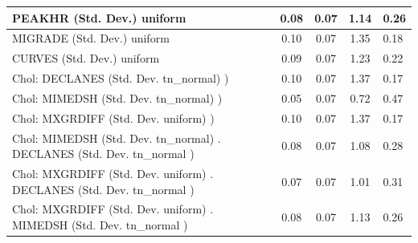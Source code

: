 \begin{table}
\begin{center}
\begin{tabular}{|l|l|c|c|c|l|}
			\hline
			PEAKHR (Std. Dev.) uniform &  & 0.08 & 0.07 & 1.14 & 0.26 \\
			\hline
			MIGRADE (Std. Dev.) uniform &  & 0.10 & 0.07 & 1.35 & 0.18 \\
			\hline
			CURVES (Std. Dev.) uniform &  & 0.09 & 0.07 & 1.23 & 0.22 \\
			\hline
			 Chol: DECLANES (Std. Dev. tn_normal) ) &  & 0.10 & 0.07 & 1.37 & 0.17 \\
			\hline
			 Chol: MIMEDSH (Std. Dev. tn_normal) ) &  & 0.05 & 0.07 & 0.72 & 0.47 \\
			\hline
			 Chol: MXGRDIFF (Std. Dev. uniform) ) &  & 0.10 & 0.07 & 1.37 & 0.17 \\
			\hline
			 Chol: MIMEDSH (Std. Dev. tn_normal) . DECLANES (Std. Dev.   tn_normal ) &  & 0.08 & 0.07 & 1.08 & 0.28 \\
			\hline
			 Chol: MXGRDIFF (Std. Dev. uniform) . DECLANES (Std. Dev.   tn_normal ) &  & 0.07 & 0.07 & 1.01 & 0.31 \\
			\hline
			 Chol: MXGRDIFF (Std. Dev. uniform) . MIMEDSH (Std. Dev.   tn_normal ) &  & 0.08 & 0.07 & 1.13 & 0.26 \\
			\hline
		\end{tabular}
	\end{center}
\end{table}